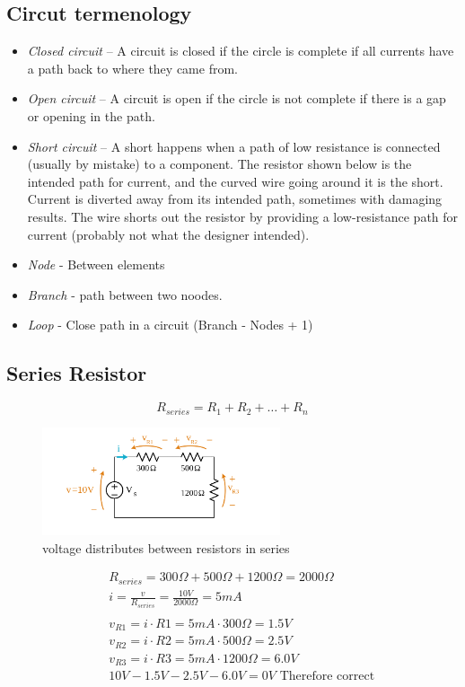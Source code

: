 \subsection{Circut termenology}
\begin{itemize}
    \item \textit{Closed circuit} – A circuit is closed if the circle is complete if all currents have a path back to where they came from.
    \item \textit{Open circuit} – A circuit is open if the circle is not complete if there is a gap or opening in the path.
    \item \textit{Short circuit} – A short happens when a path of low resistance is connected (usually by mistake) to a component. The resistor shown below is the intended path for current, and the curved wire going around it is the short. Current is diverted away from its intended path, sometimes with damaging results. The wire shorts out the resistor by providing a low-resistance path for current (probably not what the designer intended).
    \item \textit{Node} - Between elements
    \item \textit{Branch} - path between two noodes.
    \item \textit{Loop} - Close path in a circuit  (Branch - Nodes + 1)
\end{itemize}

\subsection{Series Resistor}
\begin{equation} R_{series} = R_1 + R_2 + \ldots + R_n \end{equation}

\begin{figure}[h]
    \vspace{10mm}
    \centering
    \includegraphics[width=7cm]{image/voltage-distributes-between-resistors-in-series.png}
    \caption{voltage distributes between resistors in series}
\end{figure}


\begin{align*}
  &\quad R_{series} = 300\Omega + 500\Omega + 1200\Omega = 2000\Omega \\
  &\quad i = \frac{v}{R_{series}} = \frac{10V}{2000\Omega} = 5mA \\
  &\quad \\
  &\quad v_{R1} = i\cdot R1 = 5mA\cdot 300\Omega = 1.5V \\
  &\quad v_{R2} = i\cdot R2 = 5mA\cdot 500\Omega = 2.5V \\
  &\quad v_{R3} = i\cdot R3 = 5mA\cdot 1200\Omega = 6.0V \\
  &\quad 10V -1.5V -2.5V -6.0V = 0V \text{ Therefore correct }\\
\end{align*}


